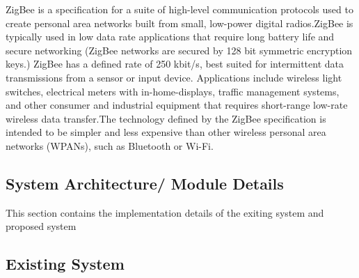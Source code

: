 \documentclass[10pt,a4paper]{article}
\begin{document}
\quad 
ZigBee is a specification for a suite of high-level communication protocols used to create personal area networks built from small, low-power digital radios.ZigBee is typically used in low data rate applications that require long battery life and secure networking (ZigBee networks are secured by 128 bit symmetric encryption keys.) ZigBee has a defined rate of 250 kbit/s, best suited for intermittent data transmissions from a sensor or input device.
Applications include wireless light switches, electrical meters with in-home-displays, traffic management systems, and other consumer and industrial equipment that requires short-range low-rate wireless data transfer.The technology defined by the ZigBee specification is intended to be simpler and less expensive than other wireless personal area networks (WPANs), such as Bluetooth or Wi-Fi.\cite{6}


\begin{large}
\section{System Architecture/ Module Details}
\quad \quad\quad This section contains the implementation details of the exiting system and proposed system 
\end{large}


\subsection{Existing System}
\end{document}
